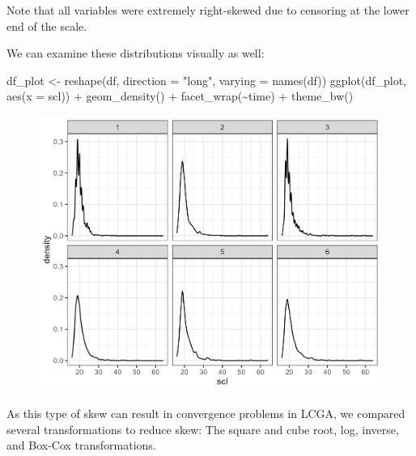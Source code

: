 \documentclass[
  man,floatsintext]{apa6}
\newenvironment{Shaded}{\begin{snugshade}}{\end{snugshade}}
\newcommand{\AttributeTok}[1]{\textcolor[rgb]{0.77,0.63,0.00}{#1}}
\newcommand{\FunctionTok}[1]{\textcolor[rgb]{0.00,0.00,0.00}{#1}}
\newcommand{\NormalTok}[1]{#1}
\newcommand{\OtherTok}[1]{\textcolor[rgb]{0.56,0.35,0.01}{#1}}
\newcommand{\SpecialCharTok}[1]{\textcolor[rgb]{0.00,0.00,0.00}{#1}}
\newcommand{\StringTok}[1]{\textcolor[rgb]{0.31,0.60,0.02}{#1}}
\begin{document}
Note that all variables were extremely right-skewed due to censoring at the lower end of the scale.

We can examine these distributions visually as well:

\begin{Shaded}
\begin{Highlighting}[]
\NormalTok{df\_plot }\OtherTok{\textless{}{-}} \FunctionTok{reshape}\NormalTok{(df, }\AttributeTok{direction =} \StringTok{"long"}\NormalTok{, }\AttributeTok{varying =} \FunctionTok{names}\NormalTok{(df))}
\FunctionTok{ggplot}\NormalTok{(df\_plot, }\FunctionTok{aes}\NormalTok{(}\AttributeTok{x =}\NormalTok{ scl)) }\SpecialCharTok{+} \FunctionTok{geom\_density}\NormalTok{() }\SpecialCharTok{+} \FunctionTok{facet\_wrap}\NormalTok{(}\SpecialCharTok{\textasciitilde{}}\NormalTok{time) }\SpecialCharTok{+}
    \FunctionTok{theme\_bw}\NormalTok{()}
\end{Highlighting}
\end{Shaded}

\begin{figure}
\includegraphics[width=0.5\linewidth]{appendices/plot_dist} \caption{ }\label{fig:unnamed-chunk-5}
\end{figure}

As this type of skew can result in convergence problems in LCGA,
we compared several transformations to reduce skew:
The square and cube root, log, inverse, and Box-Cox transformations.
\end{document}
